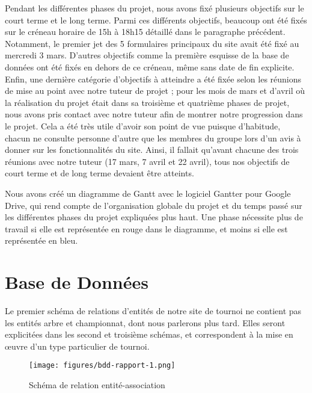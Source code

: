 \documentclass[12pt]{report}
\begin{document}
        \bigskip
        \par
        Pendant les différentes phases du projet, nous avons fixé plusieurs objectifs sur le court terme et le long terme. Parmi ces différents objectifs, beaucoup ont été fixés sur le créneau horaire de 15h à 18h15 détaillé dans le paragraphe précédent. Notamment, le premier jet des 5 formulaires principaux du site avait été fixé au mercredi 3 mars. D’autres objectifs comme la première esquisse de la base de données ont été fixés en dehors de ce créneau, même sans date de fin explicite. Enfin, une dernière catégorie d’objectifs à atteindre a été fixée selon les réunions de mise au point avec notre tuteur de projet ; pour les mois de mars et d’avril où la réalisation du projet était dans sa troisième et quatrième phases de projet, nous avons pris contact avec notre tuteur afin de montrer notre progression dans le projet. Cela a été très utile d’avoir son point de vue puisque d’habitude, chacun ne consulte personne d’autre que les membres du groupe lors d’un avis à donner sur les fonctionnalités du site. Ainsi, il fallait qu’avant chacune des trois réunions avec notre tuteur (17 mars, 7 avril et 22 avril), tous nos objectifs de court terme et de long terme devaient être atteints.
        
        \bigskip
        \par
        Nous avons créé un diagramme de Gantt avec le logiciel Gantter pour Google Drive, qui rend compte de l’organisation globale du projet et du temps passé sur les différentes phases du projet expliquées plus haut. Une phase nécessite plus de travail si elle est représentée en rouge dans le diagramme, et moins si elle est représentée en bleu.

        \chapter{Base de Données}
        
        \par
        Le premier schéma de relations d'entités de notre site de tournoi ne contient pas les entités arbre et championnat, dont nous parlerons plus tard. Elles seront explicitées dans les second et  troisième schémas, et correspondent à la mise en œuvre d'un type particulier de tournoi. 
        
        \begin{figure}[!h]
			\centering
				\texttt{[image: figures/bdd-rapport-1.png]}
			\caption{Schéma de relation entité-association}
		\end{figure}
		
\end{document}
